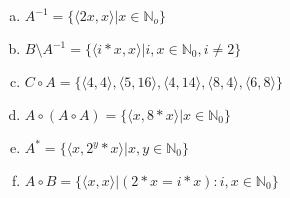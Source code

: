 \documentclass{article} %
\begin{document}
\begin{enumerate}[(a)]
	\item
	$ A^{-1} = \{\langle 2x,x \rangle \lvert x \in \mathbb N_o \}$
	\item
	$ B \setminus A^{-1} = \{\langle i*x,x \rangle \lvert i,x \in \mathbb N_0, i \neq 2\}$
	\item
	$C \circ A = \{\langle 4,4 \rangle,\langle 5,16 \rangle, \langle 4,14\rangle, \langle 8,4 \rangle,\langle 6,8\rangle\}$
	\item
	$A \circ (A \circ A) = \{ \langle x,8*x\rangle\lvert x\in \mathbb N_0\}$
 	\item
	 $A^{*} = \{\langle x ,2^y*x\rangle\lvert x,y \in \mathbb N_0\}$
	 \item 
	 $A \circ B = \{\langle x,x\rangle \lvert (2*x = i*x) : i,x \in \mathbb N_0\}$

\end{enumerate}
\end{document}
